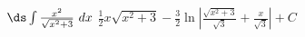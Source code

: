 {$\ds \int \frac{x^2}{\sqrt{x^2+3}}\ dx$
}
{$\frac12x\sqrt{x^2+3}-\frac32\ln\left|\frac{\sqrt{x^2+3}}{\sqrt{3}}+\frac x{\sqrt{3}}\right|+C$
}